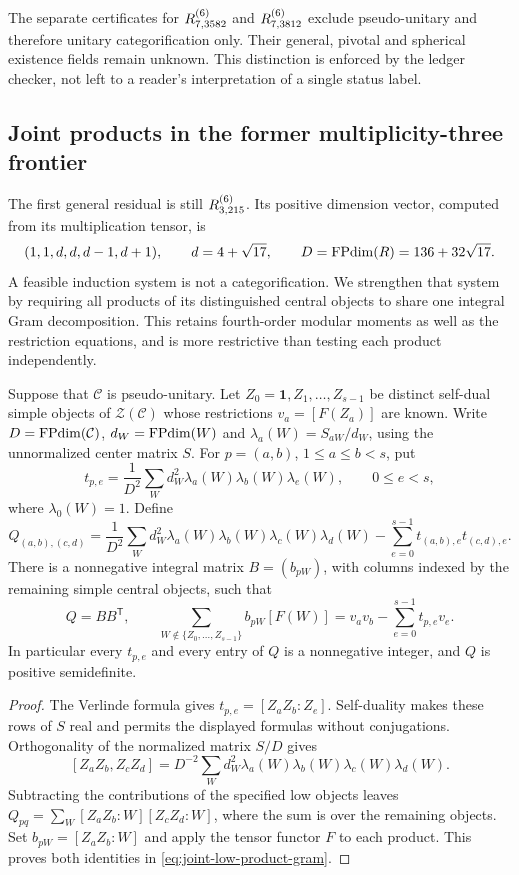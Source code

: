 The separate certificates for $R^{(6)}_{7,3582}$ and
$R^{(6)}_{7,3812}$ exclude pseudo-unitary and therefore unitary
categorification only. Their general, pivotal and spherical existence
fields remain unknown. This distinction is enforced by the ledger
checker, not left to a reader's interpretation of a single status label.



\subsection{Joint products in the former multiplicity-three frontier}
\label{sec:joint-low-product-gram}
The first general residual is still $R^{(6)}_{3,215}$. Its positive dimension
vector, computed from its multiplication tensor, is
\[
 (1,1,d,d,d-1,d+1),\qquad d=4+\sqrt{17},\qquad
 D=\operatorname{FPdim}(R)=136+32\sqrt{17}.
\]
A feasible induction system is not a categorification. We strengthen that
system by requiring all products of its distinguished central objects to
share one integral Gram decomposition. This retains fourth-order modular
moments as well as the restriction equations, and is more restrictive
than testing each product independently.

\begin{proposition}
\label{prop:joint-low-product-gram}
Suppose that $\mathcal C$ is pseudo-unitary. Let
$Z_0=\mathbf1,Z_1,\ldots,Z_{s-1}$ be distinct self-dual simple objects
of $\mathcal Z(\mathcal C)$ whose restrictions $v_a=[F(Z_a)]$ are known.
Write $D=\operatorname{FPdim}(\mathcal C)$, $d_W=\operatorname{FPdim}(W)$ and
$\lambda_a(W)=S_{aW}/d_W$, using the unnormalized center matrix $S$.
For $p=(a,b)$, $1\leq a\leq b<s$, put
\[
 t_{p,e}=\frac1{D^2}\sum_W
       d_W^2\lambda_a(W)\lambda_b(W)\lambda_e(W),
 \qquad 0\leq e<s,
\]
where $\lambda_0(W)=1$. Define
\[
 Q_{(a,b),(c,d)}=
 \frac1{D^2}\sum_W d_W^2
       \lambda_a(W)\lambda_b(W)\lambda_c(W)\lambda_d(W)
       -\sum_{e=0}^{s-1}t_{(a,b),e}t_{(c,d),e}.
\]
There is a nonnegative integral matrix $B=(b_{pW})$, with columns indexed
by the remaining simple central objects, such that
\begin{equation}\label{eq:joint-low-product-gram}
 Q=BB^{\mathsf T},\qquad
 \sum_{W\notin\{Z_0,\ldots,Z_{s-1}\}}b_{pW}[F(W)]
       =v_av_b-\sum_{e=0}^{s-1}t_{p,e}v_e.
\end{equation}
In particular every $t_{p,e}$ and every entry of $Q$ is a nonnegative
integer, and $Q$ is positive semidefinite.
\end{proposition}
\begin{proof}
The Verlinde formula gives $t_{p,e}=[Z_aZ_b:Z_e]$. Self-duality makes
these rows of $S$ real and permits the displayed formulas without
conjugations. Orthogonality of the normalized matrix $S/D$ gives
\[
 [Z_aZ_b,Z_cZ_d]
   =D^{-2}\sum_W d_W^2
         \lambda_a(W)\lambda_b(W)\lambda_c(W)\lambda_d(W).
\]
Subtracting the contributions of the specified low objects leaves
$Q_{pq}=\sum_W[Z_aZ_b:W][Z_cZ_d:W]$, where the sum is over the
remaining objects. Set $b_{pW}=[Z_aZ_b:W]$ and apply the tensor functor
$F$ to each product. This proves both identities in
\eqref{eq:joint-low-product-gram}.
\end{proof}

